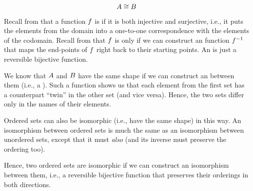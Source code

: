 \documentclass[../../../main.tex]{subfiles}
\begin{document}
\begin{equation*}
  \set{A} \isomorphic/ \set{B}
\end{equation*}

\begin{aside}
  \begin{remark}
    Recall from  that a function $f$ is  if it is both injective and surjective, i.e., it puts the elements from the domain into a one-to-one correspondence with the elements of the codomain. Recall from  that $f$ is  only if we can construct an  function $f^{-1}$ that maps the end-points of $f$ right back to their starting points. An  is just a reversible bijective function.
  \end{remark}
\end{aside}

We know that $A$ and $B$ have the same shape if we can construct an  between them (i.e., a ). Such a function shows us that each element from the first set has a counterpart ``twin'' in the other set (and vice versa). Hence, the two sets differ only in the names of their elements.

Ordered sets can also be isomorphic (i.e., have the same shape) in this way. An isomorphism between ordered sets is much the same as an isomorphism between unordered sets, except that it must \emph{also}  (and its inverse must preserve the ordering too).

Hence, two ordered sets are isomorphic if we can construct an  isomorphism between them, i.e., a reversible bijective function that preserves their orderings in both directions.
\end{document}
